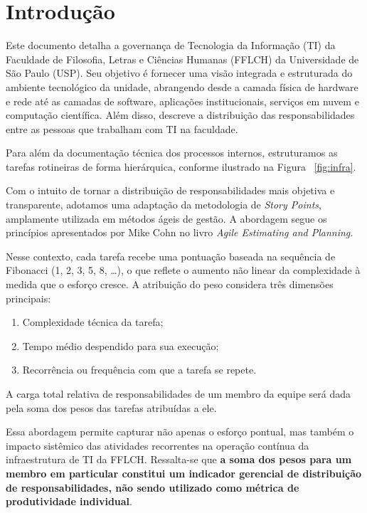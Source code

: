 \chapter*{Introdução}

Este documento detalha a governança de Tecnologia da Informação (TI) da Faculdade de Filosofia, Letras e Ciências Humanas (FFLCH) da Universidade de São Paulo (USP). Seu objetivo é fornecer uma visão integrada e estruturada do ambiente tecnológico da unidade, abrangendo desde a camada física de hardware e rede até as camadas de software, aplicações institucionais, serviços em nuvem e computação científica. Além disso, descreve a distribuição das responsabilidades entre as pessoas que trabalham com TI na faculdade.

Para além da documentação técnica dos processos internos, estruturamos as tarefas rotineiras de forma hierárquica, conforme ilustrado na Figura ~\ref{fig:infra}.

Com o intuito de tornar a distribuição de responsabilidades mais objetiva e transparente, adotamos uma adaptação da metodologia de \textit{Story Points}, amplamente utilizada em métodos ágeis de gestão. A abordagem segue os princípios apresentados por Mike Cohn no livro \textit{Agile Estimating and Planning}.

Nesse contexto, cada tarefa recebe uma pontuação baseada na sequência de Fibonacci (1, 2, 3, 5, 8, \dots), o que reflete o aumento não linear da complexidade à medida que o esforço cresce.
A atribuição do peso considera três dimensões principais:

\begin{enumerate}
    \item Complexidade técnica da tarefa;
    \item Tempo médio despendido para sua execução;
    \item Recorrência ou frequência com que a tarefa se repete.
\end{enumerate}

A carga total relativa de responsabilidades de um membro da equipe será dada pela soma dos pesos das tarefas atribuídas a ele.

Essa abordagem permite capturar não apenas o esforço pontual, mas também o impacto sistêmico das atividades recorrentes na operação contínua da infraestrutura de TI da FFLCH. Ressalta-se que \textbf{a soma dos pesos para um membro em particular constitui um indicador gerencial de distribuição de responsabilidades, não sendo utilizado como métrica de produtividade individual}.

